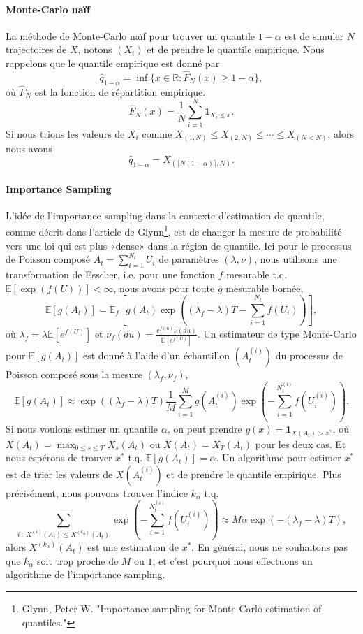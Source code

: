 \documentclass{article}
\def \E {\mathbb{E}}
\begin{document}
\paragraph{Monte-Carlo naïf} La méthode de Monte-Carlo naïf pour trouver un quantile $1-\alpha$ est de simuler $N$ trajectoires de $X$, notons $(X_i)$ et de prendre le quantile empirique. Nous rappelons que le quantile empirique est donné par
\[\hat{q}_{1-\alpha} = \inf\{x\in \mathbb{R}:\hat{F}_N(x)\geq 1-\alpha\},\]
où $\hat{F}_N$ est la fonction de répartition empirique. 
\[ \hat{F}_N(x) = \frac{1}{N}\sum_{i=1}^N \mathbf{1}_{X_i\leq x}.\]
Si nous trions les valeurs de $X_i$ comme $X_{(1,N)}\leq X_{(2,N)}\leq \cdots \leq X_{(N<N)}$, alors nous avons
\[\hat{q}_{1-\alpha} = X_{(\lceil N(1-\alpha)\rceil,N)}.\]
\paragraph{Importance Sampling} L'idée de l'importance sampling dans la contexte d'estimation de quantile, comme décrit dans l'article de Glynn\footnote{Glynn, Peter W. "Importance sampling for Monte Carlo estimation of quantiles." }, est de changer la mesure de probabilité vers une loi qui est plus «dense» dans la région de quantile. Ici pour le processus de Poisson composé $A_t=\sum_{i=1}^{N_t}U_i$ de paramètres $(\lambda, \nu)$, nous utilisons une transformation de Esscher, i.e. pour une fonction $f$ mesurable t.q. $\E[\exp(f(U))]<\infty$, nous avons pour toute $g$ mesurable bornée,
\[\E[g(A_t)]=\E_f\left[g(A_t)\exp\left((\lambda_f-\lambda)T-\sum_{i=1}^{N_t}f(U_i)\right)\right],\]
où $\lambda_f = \lambda \E[e^{f(U)}]$ et $\displaystyle \nu_f(du)=\frac{e^{f(u)}\nu(du)}{\E[e^{f(U)}]}$. Un estimateur de type Monte-Carlo pour $\E[g(A_t)]$ est donné à l'aide d'un échantillon $(A_t^{(i)})$ du processus de Poisson composé sous la mesure $(\lambda_f,\nu_f)$,
\[\E[g(A_t)]\approx \exp((\lambda_f-\lambda)T) \frac{1}{M}\sum_{i=1}^M g(A_t^{(i)})\exp\left(-\sum_{i=1}^{N_t^{(i)}}f(U_i^{(i)})\right).\]
Si nous voulons estimer un quantile $\alpha$, on peut prendre $g(x)=\mathbf{1}_{X(A_t)>x^\ast}$, où $X(A_t)=\max_{0\le s\le T}X_s(A_t)$ ou $X(A_t)=X_T(A_t)$ pour les deux cas. Et nous espérons de trouver $x^\ast$ t.q. $\E[g(A_t)]=\alpha$. Un algorithme pour estimer $x^\ast$ est de trier les valeurs de $X(A_t^{(i)})$ et de prendre le quantile empirique. Plus précisément, nous pouvons trouver l'indice $k_\alpha$ t.q.
\[\sum_{i\ :\ X^{(i)}(A_t)\le X^{(k_\alpha)}(A_t)}\exp\left(-\sum_{i=1}^{N_t^{(i)}}f(U_i^{(i)})\right)\approx M\alpha\exp(-(\lambda_f-\lambda)T),\]
alors $X^{(k_\alpha)}(A_t)$ est une estimation de $x^\ast$. En général, nous ne souhaitons pas que $k_\alpha$ soit trop proche de $M$ ou $1$, et c'est pourquoi nous effectuons un algorithme de l'importance sampling.
\end{document}
